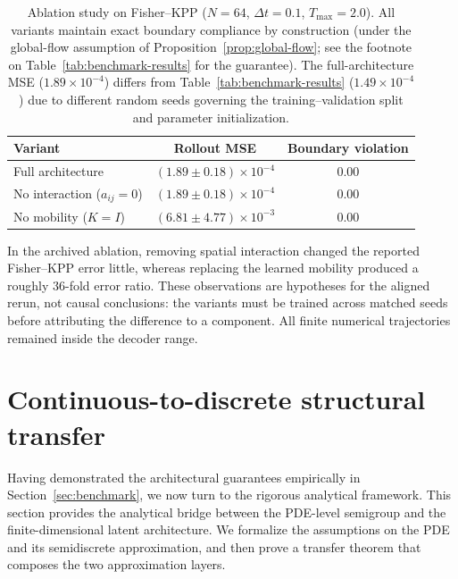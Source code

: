 \documentclass[hidelinks,review,nohypdvips,onefignum,onetabnum]{siamart220329}
\newcounter{assumption}[section]
\begin{document}
\begin{table}[htbp]
\centering
\caption{Ablation study on Fisher--KPP ($N=64$, $\Delta t=0.1$, $T_{\max}=2.0$). All variants maintain exact boundary compliance by construction (under the global-flow assumption of Proposition~\ref{prop:global-flow}; see the footnote on Table~\ref{tab:benchmark-results} for the guarantee). The full-architecture MSE ($1.89\times10^{-4}$) differs from Table~\ref{tab:benchmark-results} ($1.49\times10^{-4}$) due to different random seeds governing the training--validation split and parameter initialization.}
\label{tab:ablation}
\small
\begin{tabular}{@{}lcc@{}}
\hline
Variant & Rollout MSE & Boundary violation \\
\hline
Full architecture & $(1.89\pm 0.18)\times10^{-4}$ & $0.00$ \\
No interaction ($a_{ij}=0$) & $(1.89\pm 0.18)\times10^{-4}$ & $0.00$ \\
No mobility ($K=I$) & $(6.81\pm 4.77)\times10^{-3}$ & $0.00$ \\
\hline
\end{tabular}
\end{table}

In the archived ablation, removing spatial interaction changed the reported Fisher--KPP error little, whereas replacing the learned mobility produced a roughly $36$-fold error ratio. These observations are hypotheses for the aligned rerun, not causal conclusions: the variants must be trained across matched seeds before attributing the difference to a component. All finite numerical trajectories remained inside the decoder range.

\iffalse %
\section{Continuous-to-discrete structural transfer}\label{sec:transfer-old}

Having demonstrated the architectural guarantees empirically in Section~\ref{sec:benchmark}, we now turn to the rigorous analytical framework. This section provides the analytical bridge between the PDE-level semigroup and the finite-dimensional latent architecture. We formalize the assumptions on the PDE and its semidiscrete approximation, and then prove a transfer theorem that composes the two approximation layers.
\end{document}
